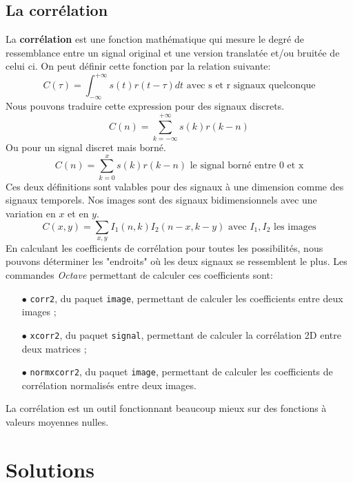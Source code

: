 \documentclass[a4paper,12pt,titlepage]{report}
\newcommand{\octave}{\textit{Octave }}
\begin{document}
		\subsection{La corrélation}
		La \textbf{corrélation} est une fonction mathématique qui mesure le degré de ressemblance entre un signal original et une version translatée et/ou bruitée de celui ci. On peut définir cette fonction par la relation suivante:
		\begin{equation}
			C(\tau)=\int_{-\infty}^{+\infty}s(t)r(t-\tau)dt \text{ avec s et r signaux quelconque}
		\end{equation}
		Nous pouvons traduire cette expression pour des signaux discrets.
		\begin{equation}
			C(n)=\sum_{k = -\infty}^{+\infty}s(k)r(k-n)	
		\end{equation}
		Ou pour un signal discret mais borné.
		\begin{equation}
			C(n)=\sum_{k = 0}^{x}s(k)r(k-n)	\text{ le signal borné entre 0 et x} 
		\end{equation}		
		Ces deux définitions sont valables pour des signaux à une dimension comme des signaux temporels. Nos images sont des signaux bidimensionnels avec une variation en $x$ et en $y$.
		\begin{equation}
			C(x,y)=\sum_{x,y} I_1(n,k)I_2(n-x,k-y) \text{ avec }I_1, I_2 \text{ les images}
		\end{equation}
		En calculant les coefficients de corrélation pour toutes les possibilités, nous pouvons déterminer les "endroits" où les deux signaux se ressemblent le plus.
		Les commandes \octave permettant de calculer ces coefficients sont:
		\begin{itemize}
		\item[$\bullet$] \texttt{corr2}, du paquet \texttt{image}, permettant de calculer les coefficients entre deux images ;
		\item[$\bullet$] \texttt{xcorr2}, du paquet \texttt{signal}, permettant de calculer la corrélation 2D entre deux matrices ;
		\item[$\bullet$] \texttt{normxcorr2}, du paquet \texttt{image}, permettant de calculer les coefficients de corrélation normalisés entre deux images. 
		\end{itemize}		
		La corrélation est un outil fonctionnant beaucoup mieux sur des fonctions à valeurs moyennes nulles.
	\section{Solutions}
\end{document}

